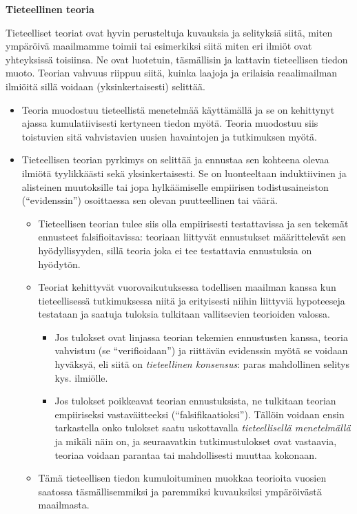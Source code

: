 \documentclass[
]{book}
\providecommand{\tightlist}{%
  \setlength{\itemsep}{0pt}\setlength{\parskip}{0pt}}
\begin{document}
\begin{defblock}{}

\textbf{Tieteellinen teoria}

Tieteelliset teoriat ovat hyvin perusteltuja kuvauksia ja selityksiä siitä, miten ympäröivä maailmamme toimii tai esimerkiksi siitä miten eri ilmiöt ovat yhteyksissä toisiinsa. Ne ovat luotetuin, täsmällisin ja kattavin tieteellisen tiedon muoto. Teorian vahvuus riippuu siitä, kuinka laajoja ja erilaisia reaalimailman ilmiöitä sillä voidaan (yksinkertaisesti) selittää.

\begin{itemize}
\tightlist
\item
  Teoria muodostuu tieteellistä menetelmää käyttämällä ja se on kehittynyt ajassa kumulatiivisesti kertyneen tiedon myötä. Teoria muodostuu siis toistuvien sitä vahvistavien uusien havaintojen ja tutkimuksen myötä.
\item
  Tieteellisen teorian pyrkimys on selittää ja ennustaa sen kohteena olevaa ilmiötä tyylikkäästi sekä yksinkertaisesti. Se on luonteeltaan induktiivinen ja alisteinen muutoksille tai jopa hylkäämiselle empiirisen todistusaineiston (``evidenssin'') osoittaessa sen olevan puutteellinen tai väärä.

  \begin{itemize}
  \tightlist
  \item
    Tieteellisen teorian tulee siis olla empiirisesti testattavissa ja sen tekemät ennusteet falsifioitavissa: teoriaan liittyvät ennustukset määrittelevät sen hyödyllisyyden, sillä teoria joka ei tee testattavia ennustuksia on hyödytön.
  \item
    Teoriat kehittyvät vuorovaikutuksessa todellisen maailman kanssa kun tieteellisessä tutkimuksessa niitä ja erityisesti niihin liittyviä hypoteeseja testataan ja saatuja tuloksia tulkitaan vallitsevien teorioiden valossa.

    \begin{itemize}
    \tightlist
    \item
      Jos tulokset ovat linjassa teorian tekemien ennustusten kanssa, teoria vahvistuu (se ``verifioidaan'') ja riittävän evidenssin myötä se voidaan hyväksyä, eli siitä on \emph{tieteellinen konsensus}: paras mahdollinen selitys kys. ilmiölle.
    \item
      Jos tulokset poikkeavat teorian ennustuksista, ne tulkitaan teorian empiiriseksi vastaväitteeksi (``falsifikaatioksi''). Tällöin voidaan ensin tarkastella onko tulokset saatu uskottavalla \emph{tieteellisellä menetelmällä} ja mikäli näin on, ja seuraavatkin tutkimustulokset ovat vastaavia, teoriaa voidaan parantaa tai mahdollisesti muuttaa kokonaan.
    \end{itemize}
  \item
    Tämä tieteellisen tiedon kumuloituminen muokkaa teorioita vuosien saatossa täsmällisemmiksi ja paremmiksi kuvauksiksi ympäröivästä maailmasta.


\end{itemize}
\end{itemize}
\end{defblock}
\end{document}
